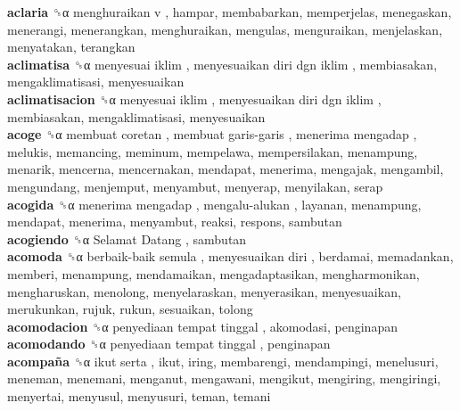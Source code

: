 \textbf{aclaria} ␝α   menghuraikan v , hampar, membabarkan, memperjelas, menegaskan, menerangi, menerangkan, menghuraikan, mengulas, menguraikan, menjelaskan, menyatakan, terangkan  \\
\textbf{aclimatisa} ␝α   menyesuai iklim ,  menyesuaikan diri dgn iklim , membiasakan, mengaklimatisasi, menyesuaikan  \\
\textbf{aclimatisacion} ␝α   menyesuai iklim ,  menyesuaikan diri dgn iklim , membiasakan, mengaklimatisasi, menyesuaikan  \\
\textbf{acoge} ␝α   membuat coretan ,  membuat garis-garis ,  menerima mengadap , melukis, memancing, meminum, mempelawa, mempersilakan, menampung, menarik, mencerna, mencernakan, mendapat, menerima, mengajak, mengambil, mengundang, menjemput, menyambut, menyerap, menyilakan, serap  \\
\textbf{acogida} ␝α   menerima mengadap ,  mengalu-alukan , layanan, menampung, mendapat, menerima, menyambut, reaksi, respons, sambutan  \\
\textbf{acogiendo} ␝α   Selamat Datang , sambutan  \\
\textbf{acomoda} ␝α   berbaik-baik semula ,  menyesuaikan diri , berdamai, memadankan, memberi, menampung, mendamaikan, mengadaptasikan, mengharmonikan, mengharuskan, menolong, menyelaraskan, menyerasikan, menyesuaikan, merukunkan, rujuk, rukun, sesuaikan, tolong  \\
\textbf{acomodacion} ␝α   penyediaan tempat tinggal , akomodasi, penginapan  \\
\textbf{acomodando} ␝α   penyediaan tempat tinggal , penginapan  \\
\textbf{acompaña} ␝α   ikut serta , ikut, iring, membarengi, mendampingi, menelusuri, meneman, menemani, menganut, mengawani, mengikut, mengiring, mengiringi, menyertai, menyusul, menyusuri, teman, temani  \\
